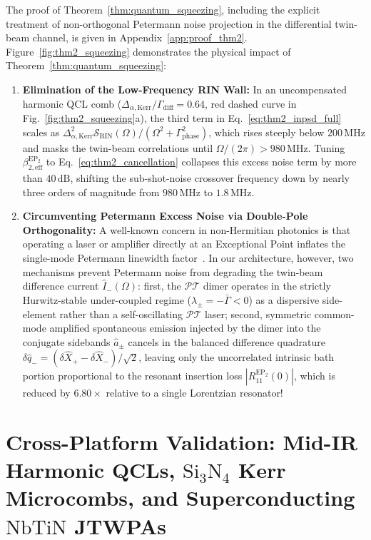 \documentclass[11pt,letterpaper]{article}
\theoremstyle{definition}
\theoremstyle{remark}
\begin{document}
The proof of Theorem~\ref{thm:quantum_squeezing}, including the explicit treatment of non-orthogonal Petermann noise projection in the differential twin-beam channel, is given in Appendix~\ref{app:proof_thm2}. Figure~\ref{fig:thm2_squeezing} demonstrates the physical impact of Theorem~\ref{thm:quantum_squeezing}:
\begin{enumerate}
    \item \textbf{Elimination of the Low-Frequency RIN Wall:} In an uncompensated harmonic QCL comb ($\Delta_{\alpha,\mathrm{Kerr}}/\Gamma_{\mathrm{diff}} = 0.64$, red dashed curve in Fig.~\ref{fig:thm2_squeezing}a), the third term in Eq.~\eqref{eq:thm2_inpsd_full} scales as $\Delta_{\alpha,\mathrm{Kerr}}^2 \mathcal{S}_{\mathrm{RIN}}(\Omega)/(\Omega^2 + \Gamma_{\mathrm{phase}}^2)$, which rises steeply below $200\,\mathrm{MHz}$ and masks the twin-beam correlations until $\Omega/(2\pi) > 980\,\mathrm{MHz}$. Tuning $\beta_{2,\mathrm{eff}}^{\mathrm{EP}_2}$ to Eq.~\eqref{eq:thm2_cancellation} collapses this excess noise term by more than $40\,\mathrm{dB}$, shifting the sub-shot-noise crossover frequency down by nearly three orders of magnitude from $980\,\mathrm{MHz}$ to $1.8\,\mathrm{MHz}$.
    \item \textbf{Circumventing Petermann Excess Noise via Double-Pole Orthogonality:} A well-known concern in non-Hermitian photonics is that operating a laser or amplifier directly at an Exceptional Point inflates the single-mode Petermann linewidth factor~\cite{Ozdemir2019,Miri2019}. In our architecture, however, two mechanisms prevent Petermann noise from degrading the twin-beam difference current $\hat{I}_-(\Omega)$: first, the $\mathcal{PT}$ dimer operates in the strictly Hurwitz-stable under-coupled regime ($\lambda_\pm = -\bar{\Gamma} < 0$) as a dispersive side-element rather than a self-oscillating $\mathcal{PT}$ laser; second, symmetric common-mode amplified spontaneous emission injected by the dimer into the conjugate sidebands $\hat{a}_\pm$ cancels in the balanced difference quadrature $\delta\hat{q}_- = (\delta\hat{X}_+ - \delta\hat{X}_-)/\sqrt{2}$, leaving only the uncorrelated intrinsic bath portion proportional to the resonant insertion loss $|R_{11}^{\mathrm{EP}_2}(0)|$, which is reduced by $6.80\times$ relative to a single Lorentzian resonator!
\end{enumerate}

\section{Cross-Platform Validation: Mid-IR Harmonic QCLs, $\mathrm{Si_3N_4}$ Kerr Microcombs, and Superconducting $\mathrm{NbTiN}$ JTWPAs}
\label{sec:cross_platform}
\end{document}

